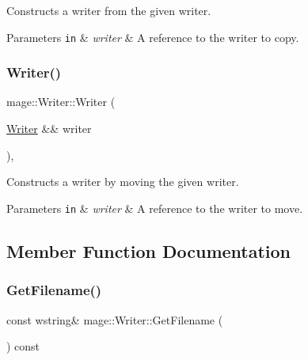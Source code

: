 Constructs a writer from the given writer.


\begin{DoxyParams}[1]{Parameters}
\mbox{\tt in}  & {\em writer} & A reference to the writer to copy. \\
\hline
\end{DoxyParams}
\hypertarget{classmage_1_1_writer_a2581e06e581aed84ee2d3c6a82c7cf58}{}\label{classmage_1_1_writer_a2581e06e581aed84ee2d3c6a82c7cf58} 
\subsubsection{\texorpdfstring{Writer()}{Writer()}\hspace{0.1cm}{\footnotesize\ttfamily [3/3]}}
{\footnotesize\ttfamily mage\+::\+Writer\+::\+Writer (\begin{DoxyParamCaption}\item[{\hyperlink{classmage_1_1_writer}{Writer} \&\&}]{writer }\end{DoxyParamCaption})\hspace{0.3cm}{\ttfamily [protected]}, {\ttfamily [default]}}

Constructs a writer by moving the given writer.


\begin{DoxyParams}[1]{Parameters}
\mbox{\tt in}  & {\em writer} & A reference to the writer to move. \\
\hline
\end{DoxyParams}


\subsection{Member Function Documentation}
\hypertarget{classmage_1_1_writer_aedbc8d5fa02444ecba2e040ca8e98281}{}\label{classmage_1_1_writer_aedbc8d5fa02444ecba2e040ca8e98281} 
\subsubsection{\texorpdfstring{Get\+Filename()}{GetFilename()}}
{\footnotesize\ttfamily const wstring\& mage\+::\+Writer\+::\+Get\+Filename (\begin{DoxyParamCaption}{ }\end{DoxyParamCaption}) const\hspace{0.3cm}{\ttfamily [noexcept]}}

